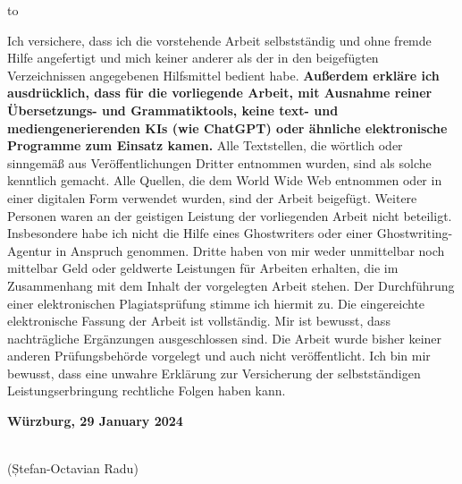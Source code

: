 \documentclass[runningheads,a4paper]{uwsese}
\newcommand{\authorName}{Ștefan-Octavian Radu}
\newcommand{\place}{Würzburg}
\newcommand{\submissionTime}{29 January 2024}
\begin{document}
\newpage





\cleardoublepage
\hbox to \textwidth{\hrulefill}
\par

\noindent Ich versichere, dass ich die vorstehende Arbeit selbstständig und ohne fremde Hilfe angefertigt und mich keiner anderer als der in den beigefügten Verzeichnissen angegebenen Hilfsmittel bedient habe.
\textbf{Außerdem erkläre ich ausdrücklich, dass für die vorliegende Arbeit, mit Ausnahme reiner Übersetzungs- und Grammatiktools, keine text- und mediengenerierenden KIs (wie ChatGPT) oder ähnliche elektronische Programme zum Einsatz kamen.}
Alle Textstellen, die wörtlich oder sinngemäß aus Veröffentlichungen Dritter entnommen wurden, sind als solche kenntlich gemacht.
Alle Quellen, die dem World Wide Web entnommen oder in einer digitalen Form verwendet wurden, sind der Arbeit beigefügt.
\bigbreak
\noindent Weitere Personen waren an der geistigen Leistung der vorliegenden Arbeit nicht beteiligt.
Insbesondere habe ich nicht die Hilfe eines Ghostwriters oder einer Ghostwriting-Agentur in Anspruch genommen.
Dritte haben von mir weder unmittelbar noch mittelbar Geld oder geldwerte Leistungen für Arbeiten erhalten, die im Zusammenhang mit dem Inhalt der vorgelegten Arbeit stehen.
\bigbreak
\noindent Der Durchführung einer elektronischen Plagiatsprüfung stimme ich hiermit zu.
Die eingereichte elektronische Fassung der Arbeit ist vollständig.
Mir ist bewusst, dass nach\-träg\-li\-che Ergänzungen ausgeschlossen sind.
\bigbreak
\noindent Die Arbeit wurde bisher keiner anderen Prüfungsbehörde vorgelegt und auch nicht veröffentlicht.
Ich bin mir bewusst, dass eine unwahre Erklärung zur Versicherung der selbstständigen Leistungserbringung rechtliche Folgen haben kann.

\vspace*{2\baselineskip}

\noindent\textbf{\place, \submissionTime}
\vspace{1.5cm}

\noindent\dotfill\hspace*{8.0cm}\\
\noindent\hspace*{2cm}(\authorName) %


\thispagestyle{empty}
\end{document}
